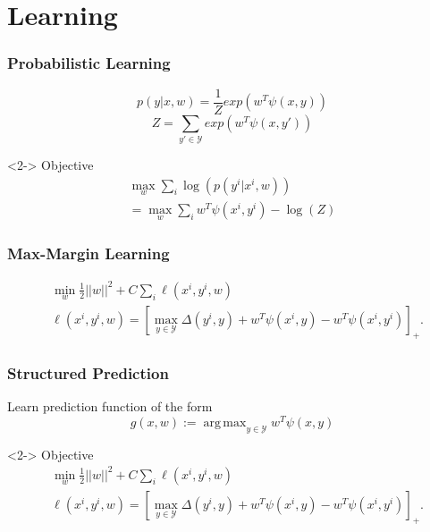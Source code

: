 \documentclass[final,ignorenonframetext,compress]{beamer}
\DeclareMathOperator*{\argmax}{arg\,max}
\newcommand{\hoch}[1]{^{#1}}
\begin{document}
\section{Learning}
\begin{frame}
    \frametitle{Probabilistic Learning}
    \[ p(y|x, w) = \frac{1}{Z} exp(w^T \psi(x, y))\]
    \[Z = \sum_{y' \in \mathcal{Y}} exp(w^T \psi(x, y')) \]
    \begin{visibleenv}<2->
    Objective
    \begin{align*}
        \max_w \sum_i \log(p(y\hoch{i} | x\hoch{i}, w))\\
        = \max_w \sum_i w^T \psi(x\hoch{i}, y\hoch{i}) - \log(Z)
    \end{align*}
    \end{visibleenv}

\end{frame}

\begin{frame}
    \frametitle{Max-Margin Learning}
    \begin{align*}
        &\min_w \frac{1}{2} ||w||^2 + C \sum_i  \ell(x\hoch{i}, y\hoch{i}, w)\\
        &\ell(x\hoch{i}, y\hoch{i}, w) = [\max_{y \in \mathcal{Y}} \Delta(y\hoch{i}, y) + w^T \psi(x\hoch{i}, y) - w^T \psi(x\hoch{i}, y\hoch{i})]_+.
    \end{align*}
\end{frame}


\begin{frame}
    \frametitle{Structured Prediction}
    Learn prediction function of the form
    \[g(x, w) := \argmax_{y \in \mathcal{Y}}  w^T \psi(x, y) \]
    \begin{visibleenv}<2->
        Objective
        \begin{align*}
            &\min_w \frac{1}{2} ||w||^2 + C \sum_i  \ell(x\hoch{i}, y\hoch{i}, w)\\
            &\ell(x\hoch{i}, y\hoch{i}, w) = [\max_{y \in \mathcal{Y}} \Delta(y\hoch{i}, y) + w^T \psi(x\hoch{i}, y) - w^T \psi(x\hoch{i}, y\hoch{i})]_+.
        \end{align*}
    \citet{joachims2009cutting}
    \end{visibleenv}

\end{frame}
\end{document}
